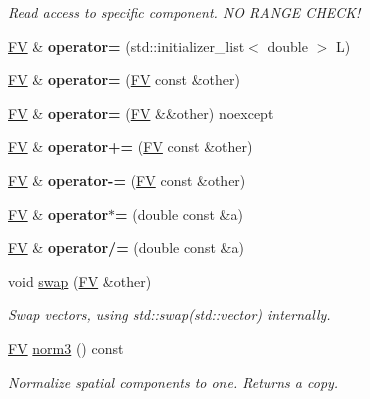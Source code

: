 \begin{DoxyCompactItemize}
\begin{DoxyCompactList}\small\item\em Read access to specific component. N\+O R\+A\+N\+G\+E C\+H\+E\+C\+K! \end{DoxyCompactList}\item 
\hypertarget{classFV_a3ce0839ccafbead03b532cdf4af5d4c1}{}\hyperlink{classFV}{F\+V} \& {\bfseries operator=} (std\+::initializer\+\_\+list$<$ double $>$ L)\label{classFV_a3ce0839ccafbead03b532cdf4af5d4c1}

\item 
\hypertarget{classFV_aa7bad77e8a25ff4d3d769a544eccf314}{}\hyperlink{classFV}{F\+V} \& {\bfseries operator=} (\hyperlink{classFV}{F\+V} const \&other)\label{classFV_aa7bad77e8a25ff4d3d769a544eccf314}

\item 
\hypertarget{classFV_ac95050de7df77088ad31b1c755e2fe33}{}\hyperlink{classFV}{F\+V} \& {\bfseries operator=} (\hyperlink{classFV}{F\+V} \&\&other) noexcept\label{classFV_ac95050de7df77088ad31b1c755e2fe33}

\item 
\hypertarget{classFV_ac30a0c8c757d2e5dbd74131f569f48db}{}\hyperlink{classFV}{F\+V} \& {\bfseries operator+=} (\hyperlink{classFV}{F\+V} const \&other)\label{classFV_ac30a0c8c757d2e5dbd74131f569f48db}

\item 
\hypertarget{classFV_a32a55d4f37e616b0b043282a201aa0f6}{}\hyperlink{classFV}{F\+V} \& {\bfseries operator-\/=} (\hyperlink{classFV}{F\+V} const \&other)\label{classFV_a32a55d4f37e616b0b043282a201aa0f6}

\item 
\hypertarget{classFV_ac50969de8023081218ac2480f4403a4d}{}\hyperlink{classFV}{F\+V} \& {\bfseries operator$\ast$=} (double const \&a)\label{classFV_ac50969de8023081218ac2480f4403a4d}

\item 
\hypertarget{classFV_a8d74f60b130edb26fd62c590ea5ecfce}{}\hyperlink{classFV}{F\+V} \& {\bfseries operator/=} (double const \&a)\label{classFV_a8d74f60b130edb26fd62c590ea5ecfce}

\item 
\hypertarget{classFV_a4e403b1c96be31cc1572c399a61d5933}{}void \hyperlink{classFV_a4e403b1c96be31cc1572c399a61d5933}{swap} (\hyperlink{classFV}{F\+V} \&other)\label{classFV_a4e403b1c96be31cc1572c399a61d5933}

\begin{DoxyCompactList}\small\item\em Swap vectors, using std\+::swap(std\+::vector) internally. \end{DoxyCompactList}\item 
\hypertarget{classFV_abb14d2d6fc605b4101dc54ae1323b5a4}{}\hyperlink{classFV}{F\+V} \hyperlink{classFV_abb14d2d6fc605b4101dc54ae1323b5a4}{norm3} () const \label{classFV_abb14d2d6fc605b4101dc54ae1323b5a4}

\begin{DoxyCompactList}\small\item\em Normalize spatial components to one. Returns a copy. \end{DoxyCompactList}\end{DoxyCompactItemize}
